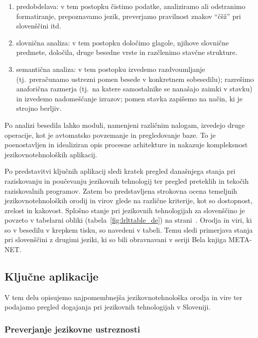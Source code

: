 \begin{multicols}{2}
\begin{enumerate}
\item predobdelava: v tem postopku čistimo podatke, analiziramo ali odstranimo formatiranje, prepoznavamo jezik, preverjamo pravilnost znakov “čšž” pri slovenščini itd.
\item slovnična analiza: v tem postopku določimo glagole, njihove slovnične predmete, določila, druge besedne vrste in razčlenimo stavčne strukture.
\item semantična analiza: v tem postopku izvedemo razdvoumljanje (tj.~preračunamo ustrezni pomen besede v konkretnem sobesedilu); razrešimo anaforična razmerja (tj.~na katere samostalnike se nanašajo zaimki v stavku) in izvedemo nadomeščanje izrazov; pomen stavka zapišemo na način, ki je stroj\-no berljiv.
\end{enumerate}

Po analizi besedila lahko moduli, namenjeni različnim nalogam, izvedejo druge operacije, kot je avtomatsko povzemanje in pregledovanje baze. To je poenostav\-ljen in idealiziran opis procesne arhitekture in nakazuje kompleksnost jezikovnotehnoloških aplikacij.

Po predstavitvi ključnih aplikacij sledi kratek pregled današnjega stanja pri raziskovanju in poučevanju jezikovnih tehnologij ter pregled preteklih in tekočih raziskovalnih programov. Zatem bo predstav\-ljena strokovna ocena temeljnih jezikovnotehnoloških orodij in virov glede na različne kriterije, kot so dostopnost, zrelost in kakovost. Splošno stanje pri jezikovnih tehnologijah za slovenščino je povzeto v tabelarni obliki (tabela~\ref{fig:lrlttable_de}) na strani~\pageref{fig:lrlttable_de}. Orodja in viri, ki so v besedilu v krepkem tisku, so navedeni v tabeli. Temu sledi primerjava stanja pri slovenščini z drugimi jeziki, ki so bili obravnavani v seriji Bela knjiga META-NET.

\subsection{Ključne aplikacije} 

V tem delu opisujemo naj\-pomem\-bnej\-ša jezikovno\-tehnološka orodja in vire ter podajamo pregled dogajanja pri jezikovnih tehnologijah v Sloveniji.

\subsubsection{Preverjanje jezikovne ustreznosti}


\end{multicols}
